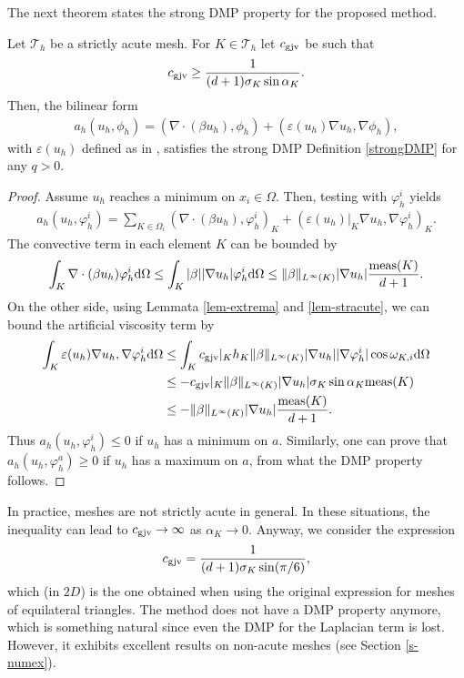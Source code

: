 The next theorem states the strong DMP property for the proposed method.
\begin{theorem}
Let $\mathcal{T}_h$ be a strictly acute mesh. For $K\in \mathcal{T}_h$ let $c_{\rm gjv}$ be such that 
\begin{align}\label{eq-cgjv1}
c_{\rm gjv} \geq \frac{1}{(d+1) \sigma_K \sin \alpha_K}.
\end{align}
Then, the bilinear form
\begin{align}\label{eq-bfgjv}
a_h(u_h,\phi_h) = (\nabla \cdot ( \beta u_h), \phi_h) + (\varepsilon(u_h) \nabla u_h, \nabla \phi_h), 
\end{align}
with $\varepsilon(u_h)$ defined as in , satisfies  the strong DMP Definition \ref{strongDMP}  for any $q>0$.
\end{theorem}
\begin{proof}
Assume $u_h$ reaches a minimum on $x_i\in\Omega$. Then, testing  with $\varphi_h^i$ yields
\begin{align*}
 a_h(u_h,\varphi_h^i) = \sum\limits_{K\in\Omega_i} (\nabla \cdot  (\beta u_h), \varphi_h^i)_K + 
 (\varepsilon(u_h)|_K \nabla u_h, \nabla \varphi_h^i)_K.
\end{align*}
The convective term in each element $K$ can be bounded by
\begin{align*}
\int_K \nabla \cdot (\beta  u_h) \varphi_h^i {\rm d}\Omega \leq \int_K |\beta| |\nabla u_h| \varphi_h^i {\rm d}\Omega \leq \|\beta\|_{L^\infty(K)} |\nabla u_h| \frac{{\rm meas}(K)}{d+1}.
\end{align*}
On the other side, using Lemmata \ref{lem-extrema} and \ref{lem-stracute}, we can bound the artificial viscosity term by
\begin{align*}
\int_K \varepsilon(u_h) \nabla u_h, \nabla \varphi^i_h {\rm d}\Omega &  \leq \int_K c_{\rm gjv}|_K h_K \|\beta\|_{L^\infty(K)} |\nabla u_h| |\nabla \varphi_h^i| \cos \omega_{K,i}{\rm d}\Omega\\
&  \leq - c_{\rm gjv}|_K \|\beta\|_{L^\infty(K)} |\nabla u_h| \sigma_K \sin \alpha_K  {\rm meas}(K) \\
& \leq - \|\beta\|_{L^\infty(K)} |\nabla u_h| \frac{{\rm meas}(K)}{d+1}.
\end{align*}
Thus $a_h(u_h,\varphi_h^i) \leq 0$ if $u_h$ has a minimum on $a$. Similarly, one can prove that $a_h(u_h,\varphi_h^a) \geq 0$ if $u_h$ has a maximum on $a$, from what the DMP property follows.
\end{proof}


In practice, meshes are not strictly acute in general. In these situations, the inequality  can lead to $c_{\rm gjv} \to \infty$ as $\alpha_K \to 0$. Anyway, we consider the expression 
\begin{align*}%
c_{\rm gjv} = \frac{1}{(d+1) \sigma_K \sin (\pi/6)},
\end{align*}
which (in $2D$) is the one obtained when using the original expression for meshes of equilateral triangles. The method does not have a DMP property anymore, which is something natural since even the DMP for the Laplacian term is lost. However, it exhibits excellent results on non-acute meshes (see Section \ref{s-numex}).

